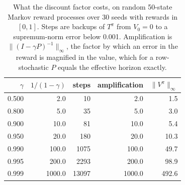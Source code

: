 \begin{table}[h]
\centering
\caption{What the discount factor costs, on random 50-state Markov reward processes over 30 seeds with rewards in $[0,1]$. Steps are backups of $T^\pi$ from $V_0 = 0$ to a supremum-norm error below 0.001. Amplification is $\|(I - \gamma P)^{-1}\|_\infty$, the factor by which an error in the reward is magnified in the value, which for a row-stochastic $P$ equals the effective horizon exactly.}
\label{tab:prelim_discount_cost}
\begin{tabular}{rrrrr}
\hline
$\gamma$ & $1/(1-\gamma)$ & steps & amplification & $\|V^\pi\|_\infty$ \\
\hline
0.500 & 2.0 & 10 & 2.0 & 1.5 \\
0.800 & 5.0 & 35 & 5.0 & 3.0 \\
0.900 & 10.0 & 81 & 10.0 & 5.4 \\
0.950 & 20.0 & 180 & 20.0 & 10.3 \\
0.990 & 100.0 & 1075 & 100.0 & 49.7 \\
0.995 & 200.0 & 2293 & 200.0 & 98.9 \\
0.999 & 1000.0 & 13097 & 1000.0 & 492.6 \\
\hline
\end{tabular}
\end{table}
